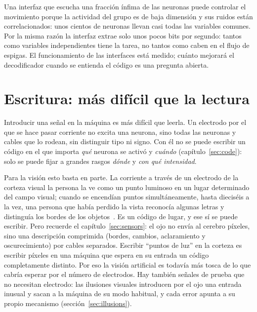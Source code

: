 \begin{keyblock}
\begin{proposition}
\label{prop:probe}
Una interfaz que escucha una fracción ínfima de las neuronas puede controlar el movimiento porque la actividad del grupo es de baja dimensión y sus ruidos están correlacionados: unos cientos de neuronas llevan casi todas las variables comunes. Por la misma razón la interfaz extrae solo unos pocos bits por segundo: tantos como variables independientes tiene la tarea, no tantos como caben en el flujo de espigas. El funcionamiento de las interfaces está medido; cuánto mejorará el decodificador cuando se entienda el código es una pregunta abierta.
\end{proposition}
\end{keyblock}

\section{Escritura: más difícil que la lectura}

Introducir una señal en la máquina es más difícil que leerla. Un electrodo por el que se hace pasar corriente no excita una neurona, sino todas las neuronas y cables que lo rodean, sin distinguir tipo ni signo. Con él no se puede escribir un código en el que importa \emph{qué} neurona se activó y \emph{cuándo} (capítulo~\ref{sec:code}): solo se puede fijar a grandes rasgos \emph{dónde} y \emph{con qué intensidad}.

Para la visión esto basta en parte. La corriente a través de un electrodo de la corteza visual la persona la ve como un punto luminoso en un lugar determinado del campo visual; cuando se encendían puntos simultáneamente, hasta dieciséis a la vez, una persona que había perdido la vista reconocía algunas letras y distinguía los bordes de los objetos~\cite{Fernandez2021}. Es un código de lugar, y ese sí se puede escribir. Pero recuerde el capítulo~\ref{sec:sensors}: el ojo no envía al cerebro píxeles, sino una descripción comprimida (bordes, cambios, aclaramiento y oscurecimiento) por cables separados. Escribir “puntos de luz” en la corteza es escribir píxeles en una máquina que espera en su entrada un código completamente distinto. Por eso la visión artificial es todavía más tosca de lo que cabría esperar por el número de electrodos. Hay también señales de prueba que no necesitan electrodo: las ilusiones visuales introducen por el ojo una entrada inusual y sacan a la máquina de su modo habitual, y cada error apunta a su propio mecanismo (sección~\ref{sec:illusions}).

